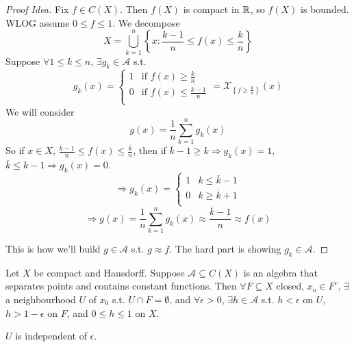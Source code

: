 \begin{proof} [Proof Idea]
Fix $f \in C(X)$. Then $f(X)$ is compact in $\mathbb{R}$, so $f(X)$ is bounded. WLOG assume $0 \leq f \leq 1$.
We decompose
\[
    X = \bigcup_{k = 1}^n \left\{ x : \frac{k-1}{n} \leq f(x) \leq \frac{k}{n} \right\} 
\]       
Suppose $\forall 1 \leq k \leq n$, $\exists g_k \in \mathcal{A}$ s.t. 
\[
    g_k(x) = \begin{cases}
        1 & \text{if } f(x) \geq \frac{k}{n} \\
        0 & \text{if } f(x) \leq \frac{k-1}{n} \\ 
    \end{cases}
    = \mathcal{X}_{ \left\{ f \geq \frac{k}{n} \right\} } (x)
\]   
We will consider \[g(x) = \frac{1}{n}\sum_{k=1}^n g_k(x)\]
So if $x \in X$, $\frac{\overline{k} -1}{n} \leq f(x) \leq \frac{\overline{k}}{n}$, then if 
$\overline{k} - 1 \geq k \Rightarrow g_k(x) = 1$, $\overline{k} \leq k - 1 \Rightarrow g_k(x) = 0$.
\[
    \Rightarrow g_k(x) = \begin{cases}
        1 & k \leq \overline{k} - 1 \\
        0 & k \geq \overline{k} + 1 \\
    \end{cases}
\]      
\[ \Rightarrow g(x) = \frac{1}{n}\sum_{k=1}^{n} g_k(x) \approx \frac{\overline{k} - 1}{n} \approx f(x) \]

This is how we'll build $g \in \mathcal{A}$ s.t. $g \approx f$.
The hard part is showing $g_k \in \mathcal{A}$.   
\end{proof}

\begin{lem}
    Let $X$ be compact and Hausdorff. Suppose $\mathcal{A} \subseteq C(X)$ is an algebra that separates
    points and contains constant functions. Then $\forall F \subseteq X$ closed, $x_o \in F^c$,
    $\exists$ a neighbourhood $U$ of $x_0$ s.t. $U \cap F = \emptyset$, and $\forall \epsilon > 0$,
    $\exists h \in \mathcal{A}$ s.t. $h < \epsilon$ on $U$, $h > 1 - \epsilon$ on $F$, 
    and $0 \leq h \leq 1$ on $X$.              
\end{lem}

\begin{rem}
    $U$ is independent of $\epsilon$.  
\end{rem}

